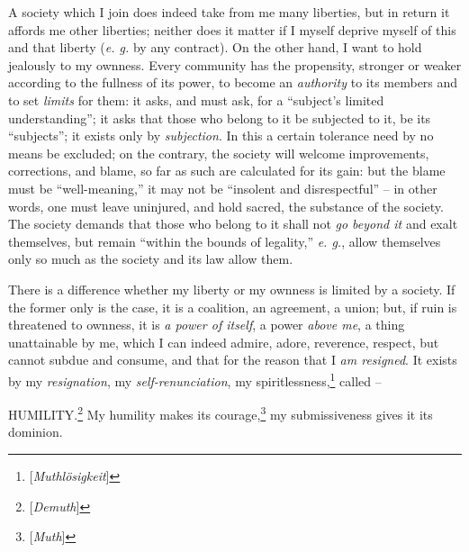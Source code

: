 \documentclass[12pt,a4paper]{book}
\begin{document}
A society which I join does indeed take from me many liberties, but in return 
it affords me other liberties; neither does it matter if I myself deprive 
myself of this and that liberty (\textit{e. g.} by any contract). On the other 
hand, I want to hold jealously to my ownness. Every community has the 
propensity, stronger or weaker according to the fullness of its power, to 
become an \textit{authority} to its members and to set \textit{limits} for 
them: it asks, and must ask, for a ``subject's limited understanding''; it 
asks that those who belong to it be subjected to it, be its ``subjects''; it 
exists only by \textit{subjection}. In this a certain tolerance need by no 
means be excluded; on the contrary, the society will welcome improvements, 
corrections, and blame, so far as such are calculated for its gain: but the 
blame must be ``well-meaning,'' it may not be ``insolent and 
disrespectful'' -- in other words, one must leave uninjured, and hold sacred, 
the substance of the society. The society demands that those who belong to it 
shall not \textit{go beyond it} and exalt themselves, but remain ``within the 
bounds of legality,'' \textit{e. g.}, allow themselves only so much as the 
society and its law allow them.

There is a difference whether my liberty or my ownness is limited by a 
society. If the former only is the case, it is a coalition, an agreement, a 
union; but, if ruin is threatened to ownness, it is \textit{a power of 
itself}, a power \textit{above me}, a thing unattainable by me, which I can 
indeed admire, adore, reverence, respect, but cannot subdue and consume, and 
that for the reason that I \textit{am resigned}. It exists by my 
\textit{resignation}, my \textit{self-renunciation}, my 
spiritlessness,\footnote{[\textit{Muthl\"osigkeit}]} called --

HUMILITY.\footnote{[\textit{Demuth}]} My humility makes its 
courage,\footnote{[\textit{Muth}]} my submissiveness gives it its dominion.
\end{document}
